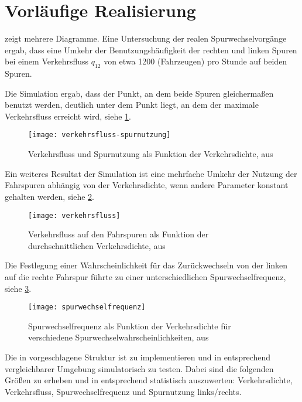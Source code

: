 \section{Vorläufige Realisierung}
\label{sec:realisierung}

\cite{wagner96} zeigt mehrere Diagramme. Eine Untersuchung der realen Spurwechselvorgänge ergab, dass eine Umkehr der Benutzungshäufigkeit der rechten und linken Spuren bei einem Verkehrsfluss $q_{12}$ von etwa 1200 (Fahrzeugen) pro Stunde auf beiden Spuren.

Die Simulation ergab, dass der Punkt, an dem beide Spuren gleichermaßen benutzt werden, deutlich unter dem Punkt liegt, an dem der maximale Verkehrsfluss erreicht wird, siehe \cref{figure:verkehrsfluss-spurnutzung}.

\begin{figure}[h]
 \centering
 \texttt{[image: verkehrsfluss-spurnutzung]}
 \caption[Verkehrsfluss und Spurnutzung als Funktion der Verkehrsdichte]{Verkehrsfluss und Spurnutzung als Funktion der Verkehrsdichte, aus \cite{multi-lane}}
 \label{figure:verkehrsfluss-spurnutzung}
\end{figure}

Ein weiteres Resultat der Simulation ist eine mehrfache Umkehr der Nutzung der Fahrspuren abhängig von der Verkehrsdichte, wenn andere Parameter konstant gehalten werden, siehe \cref{figure:verkehrsfluss}.

\begin{figure}[h]
 \centering
 \texttt{[image: verkehrsfluss]}
 \caption[Verkehrsfluss als Funktion der durchschnittlichen Verkehrsdichte]{Verkehrsfluss auf den Fahrspuren als Funktion der durchschnittlichen Verkehrsdichte, aus \cite{multi-lane}}
 \label{figure:verkehrsfluss}
\end{figure}

Die Festlegung einer Wahrscheinlichkeit für das Zurückwechseln von der linken auf die rechte Fahrspur führte zu einer unterschiedlichen Spurwechselfrequenz, siehe \cref{figure:spurwechselfrequenz}.

\begin{figure}[h]
 \centering
 \texttt{[image: spurwechselfrequenz]}
 \caption[Spurwechselfrequenz als Funktion der Verkehrsdichte]{Spurwechselfrequenz als Funktion der Verkehrsdichte für verschiedene Spurwechselwahrscheinlichkeiten, aus \cite{multi-lane}}
 \label{figure:spurwechselfrequenz}
\end{figure}

Die in \cite{dat-ba} vorgeschlagene Struktur ist zu implementieren und in entsprechend vergleichbarer Umgebung simulatorisch zu testen. Dabei sind die folgenden Größen zu erheben und in entsprechend statistisch auszuwerten: Verkehrsdichte, Verkehrsfluss, Spurwechselfrequenz und Spurnutzung links/rechts.